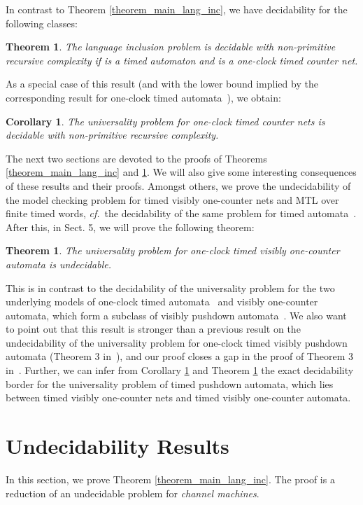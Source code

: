 \documentclass{CSML}
\theoremstyle{plain}\newtheorem{theorem}[thm]{Theorem}
\theoremstyle{plain}\newtheorem{corollary}[thm]{Corollary}
\theoremstyle{plain}\newtheorem{example}[thm]{Example}
\theoremstyle{plain}\newtheorem{lemma}[thm]{Lemma}
\theoremstyle{plain}\newtheorem{remark}[thm]{Remark}
\def\cf{{\em cf.}}
\begin{document}
	In contrast to Theorem \ref{theorem_main_lang_inc}, 
	we have decidability for the following classes: 
\begin{theorem}
		\label{theorem_main_dec}
		The language inclusion problem is decidable with non-primitive recursive complexity if  is a timed automaton and  is a one-clock timed counter net.
	\end{theorem}
	As a special case of this result (and with the lower bound implied by the corresponding result for one-clock timed automata~\cite{DBLP:journals/fuin/AbdullaDOQW08}), we obtain:
	\begin{corollary}
		\label{corollary_univ_dec}
		The universality problem for one-clock timed counter nets is decidable with non-primitive recursive complexity.
	\end{corollary}
	The next two sections are devoted to the proofs of Theorems \ref{theorem_main_lang_inc} and \ref{theorem_main_dec}. 
	We will also give some interesting consequences of these results and their proofs. 
	Amongst others, we prove the undecidability of the model checking problem for timed visibly one-counter nets and MTL over finite timed words, \cf \ the decidability of the same problem for timed automata~\cite{DBLP:conf/lics/OuaknineW05}. 
	After this, in Sect. 5, we will prove the following theorem:
	\begin{theorem}
		\label{theorem_univ_undec}
		The universality problem for one-clock timed visibly one-counter automata is undecidable.
	\end{theorem}
	This is in contrast to the decidability of the universality problem for the two underlying models of one-clock timed automata~\cite{DBLP:conf/lics/OuaknineW04} and visibly one-counter automata, which form a subclass of visibly pushdown automata~\cite{DBLP:conf/stoc/AlurM04}.  
	We also want to point out that this result 
	is stronger than a previous result on the undecidability of the universality problem for one-clock timed visibly pushdown automata (Theorem 3 in~\cite{EmmiM06}), and our proof closes a gap in the proof of Theorem 3 in~\cite{EmmiM06}. 
	Further, we can infer from Corollary \ref{corollary_univ_dec} and Theorem \ref{theorem_univ_undec} the exact decidability border for the universality problem of timed pushdown automata, which lies between timed visibly one-counter nets and timed visibly one-counter automata. 
	
	
	
	\section{Undecidability Results}
	In this section, we prove Theorem \ref{theorem_main_lang_inc}. 
	The proof is a reduction of an undecidable  problem for \emph{channel machines}. 
	
\end{document}
